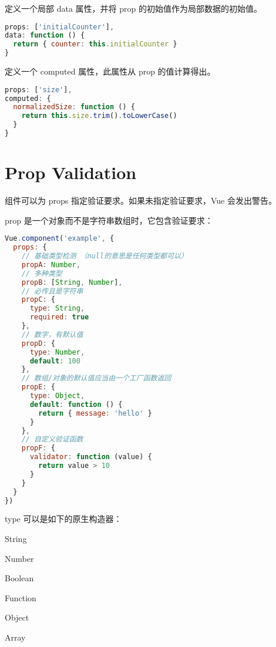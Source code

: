 \begin{compactenum}
\item 定义一个局部 data 属性，并将 prop 的初始值作为局部数据的初始值。

\begin{lstlisting}[language=JavaScript]
props: ['initialCounter'],
data: function () {
  return { counter: this.initialCounter }
}
\end{lstlisting}

\item 定义一个 computed 属性，此属性从 prop 的值计算得出。

\begin{lstlisting}[language=JavaScript]
props: ['size'],
computed: {
  normalizedSize: function () {
    return this.size.trim().toLowerCase()
  }
}
\end{lstlisting}


\end{compactenum}



\section{Prop Validation}

组件可以为 props 指定验证要求。如果未指定验证要求，Vue 会发出警告。


prop 是一个对象而不是字符串数组时，它包含验证要求：



\begin{lstlisting}[language=JavaScript]
Vue.component('example', {
  props: {
    // 基础类型检测 （null的意思是任何类型都可以）
    propA: Number,
    // 多种类型
    propB: [String, Number],
    // 必传且是字符串
    propC: {
      type: String,
      required: true
    },
    // 数字，有默认值
    propD: {
      type: Number,
      default: 100
    },
    // 数组/对象的默认值应当由一个工厂函数返回
    propE: {
      type: Object,
      default: function () {
        return { message: 'hello' }
      }
    },
    // 自定义验证函数
    propF: {
      validator: function (value) {
        return value > 10
      }
    }
  }
})
\end{lstlisting}

type 可以是如下的原生构造器：

\begin{compactitem}
\item String
\item Number
\item Boolean
\item Function
\item Object
\item Array
\end{compactitem}

